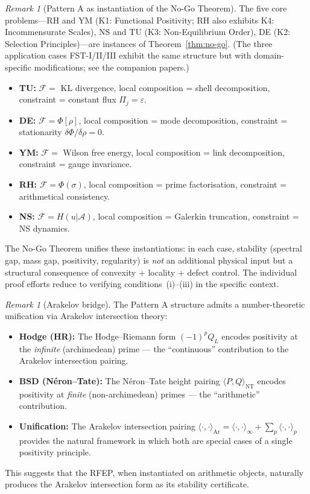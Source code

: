 \documentclass[12pt,a4paper]{article}
\theoremstyle{definition}
\theoremstyle{remark}
\newtheorem{remark}[theorem]{Remark}
\begin{document}
\begin{remark}[Pattern A as instantiation of the No-Go Theorem]
The five core problems---RH and YM (K1: Functional Positivity; RH also exhibits K4: Incommensurate Scales), NS and TU (K3: Non-Equilibrium Order), DE (K2: Selection Principles)---are instances of
Theorem~\ref{thm:no-go}. (The three application cases FST-I/II/III exhibit
the same structure but with domain-specific modifications; see the companion papers.)
\begin{itemize}
  \item \textbf{TU:} $\mathcal{F} = $ KL divergence,
    local composition = shell decomposition,
    constraint = constant flux $\Pi_j = \varepsilon$.
  \item \textbf{DE:} $\mathcal{F} = \Phi[\rho]$,
    local composition = mode decomposition,
    constraint = stationarity $\delta\Phi/\delta\rho = 0$.
  \item \textbf{YM:} $\mathcal{F} = $ Wilson free energy,
    local composition = link decomposition,
    constraint = gauge invariance.
  \item \textbf{RH:} $\mathcal{F} = \Phi(\sigma)$,
    local composition = prime factorisation,
    constraint = arithmetical consistency.
  \item \textbf{NS:} $\mathcal{F} = H(u|\mathcal{A})$,
    local composition = Galerkin truncation,
    constraint = NS dynamics.
\end{itemize}
The No-Go Theorem unifies these instantiations: in each case,
stability (spectral gap, mass gap, positivity, regularity) is
\emph{not} an additional physical input but a structural consequence
of convexity + locality + defect control. The individual proof efforts
reduce to verifying conditions~(i)--(iii) in the specific context.
\end{remark}

\begin{remark}[Arakelov bridge]
\label{rem:arakelov-bridge}
The Pattern A structure admits a number-theoretic unification via Arakelov intersection theory:
\begin{itemize}
\item \textbf{Hodge (HR):} The Hodge--Riemann form $(-1)^p Q_L$ encodes positivity at the \emph{infinite} (archimedean) prime --- the ``continuous'' contribution to the Arakelov intersection pairing.
\item \textbf{BSD (N\'eron--Tate):} The N\'eron--Tate height pairing $\langle P, Q \rangle_{\mathrm{NT}}$ encodes positivity at \emph{finite} (non-archimedean) primes --- the ``arithmetic'' contribution.
\item \textbf{Unification:} The Arakelov intersection pairing $\langle \cdot, \cdot \rangle_{\mathrm{Ar}} = \langle \cdot, \cdot \rangle_{\infty} + \sum_p \langle \cdot, \cdot \rangle_p$ provides the natural framework in which both are special cases of a single positivity principle.
\end{itemize}
This suggests that the RFEP, when instantiated on arithmetic objects, naturally produces the Arakelov intersection form as its stability certificate.
\end{remark}
\end{document}

